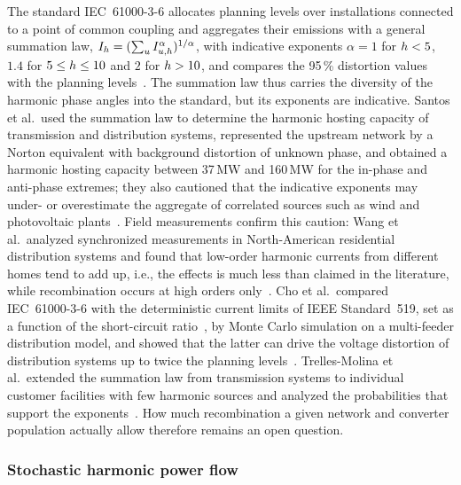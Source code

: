 The standard IEC~61000-3-6 allocates planning levels over installations connected to a point of common coupling and aggregates their emissions with a general summation law, $I_{h} = (\sum_{u} I_{u,h}^{\alpha})^{1/\alpha}$, with indicative exponents $\alpha = 1$ for $h < 5$, $1.4$ for $5 \leq h \leq 10$ and $2$ for $h > 10$, and compares the 95\,\% distortion values with the planning levels~\cite{noauthor_iec61000-3-6_2008}. The summation law thus carries the diversity of the harmonic phase angles into the standard, but its exponents are indicative. Santos et al.\ used the summation law to determine the harmonic hosting capacity of transmission and distribution systems, represented the upstream network by a Norton equivalent with background distortion of unknown phase, and obtained a harmonic hosting capacity between 37\,MW and 160\,MW for the in-phase and anti-phase extremes; they also cautioned that the indicative exponents may under- or overestimate the aggregate of correlated sources such as wind and photovoltaic plants~\cite{santos_considerations_2015}. Field measurements confirm this caution: Wang et al.\ analyzed synchronized measurements in North-American residential distribution systems and found that low-order harmonic currents from different homes tend to add up, i.e., the effects is much less than claimed in the literature, while recombination occurs at high orders only~\cite{wang_characteristics_2017}. Cho et al.\ compared IEC~61000-3-6 with the deterministic current limits of IEEE Standard~519, set as a function of the short-circuit ratio~\cite{noauthor_ieee519_2022}, by Monte Carlo simulation on a multi-feeder distribution model, and showed that the latter can drive the voltage distortion of distribution systems up to twice the planning levels~\cite{cho_analysis_2019}. Trelles-Molina et al.\ extended the summation law from transmission systems to individual customer facilities with few harmonic sources and analyzed the probabilities that support the exponents~\cite{trellesmolina_extension_2022}. How much recombination a given network and converter population actually allow therefore remains an open question.

\subsubsection{Stochastic harmonic power flow}


